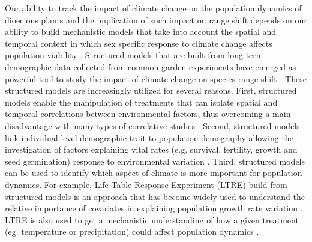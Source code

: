 \documentclass[12pt]{article}
\begin{document}
Our ability to track the impact of climate change on the population dynamics of dioecious plants and the implication of such impact on range shift depends on our ability to build mechanistic models that take into account the spatial and temporal context in which sex specific response to climate change affects population viability \citep{davis2001range,evans2016towards,czachura2020demographic}.
Structured models that are built from long-term demographic data collected from common garden experiments have emerged as powerful tool to study the impact of climate change on species range shift \citep{merow2017climate,schwinning2022common}.
These structured models are increasingly utilized for several reasons. 
First, structured models enable the manipulation of treatments that can isolate spatial and temporal correlations between environmental factors, thus overcoming a main disadvantage with many types of correlative studies \citep{leicht2007comparative}. 
Second, structured models link individual-level demographic trait to population demography allowing the investigation of factors explaining vital rates (e.g. survival, fertility, growth and seed germination) response to environmental variation \citep{louthan2022climate,dahlgren2016demography}. 
Third, structured models can be used to identify which aspect of climate is more important for population dynamics.
For example, Life Table Response Experiment (LTRE) build from structured models is an approach that has become widely used to understand 
the relative importance of covariates in explaining population growth rate variation \citep{ellner2016data}.
LTRE is also used to get a mechanistic understanding of how a given treatment (eg. temperature or precipitation) could affect population dynamics \citep {caswell1989analysis,o2024nonlinear,morrison2007demographic,iler2019reproductive}. 
\end{document}
